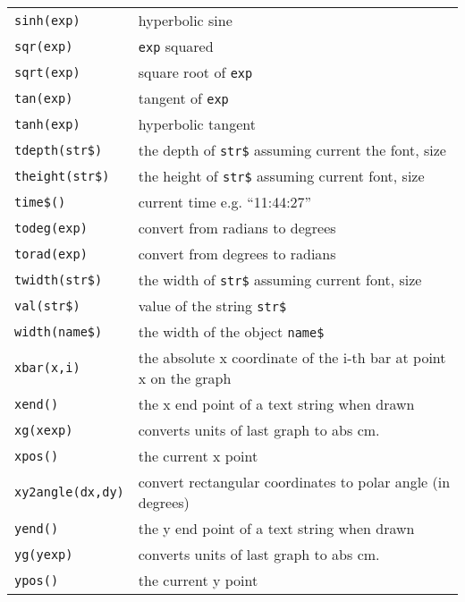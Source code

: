 \begin{supertabular}{ll}
{\tt sinh(exp)}        	& hyperbolic sine \\
{\tt sqr(exp)}          	& {\tt exp} squared  \\
{\tt sqrt(exp)}        	& square root of {\tt exp} \\
{\tt tan(exp)}          	& tangent of {\tt exp} \\	 
{\tt tanh(exp)}        	& hyperbolic tangent \\
{\tt tdepth(str\$)}  	& the depth of {\tt str\$} assuming current the font, size \\
{\tt theight(str\$)}   & the height of {\tt str\$} assuming  current font, size \\
{\tt time\$()}       	& current time e.g. ``11:44:27'' \\
{\tt todeg(exp)}      	& convert from radians to degrees \\
{\tt torad(exp)}      	& convert from degrees to radians \\
{\tt twidth(str\$)}  	& the width of {\tt str\$} assuming current font, size \\
{\tt val(str\$)}        	& value of the string {\tt str\$} \\
{\tt width(name\$)}  	& the width of the object {\tt name\$} \\
{\tt xbar(x,i)}         	& the absolute x coordinate of the i-th bar at point x on the graph \\
{\tt xend()}           	& the x end point of a text string when drawn \\
{\tt xg(xexp)}              & converts units of last graph to abs cm. \\
{\tt xpos()}           	& the current x point \\
{\tt xy2angle(dx,dy)} & convert rectangular coordinates to polar angle (in degrees)\\
{\tt yend()}           	& the y end point of a text string when drawn \\
{\tt yg(yexp)}              & converts units of last graph to abs cm. \\
{\tt ypos()}           	& the current y point \\
\end{supertabular}

